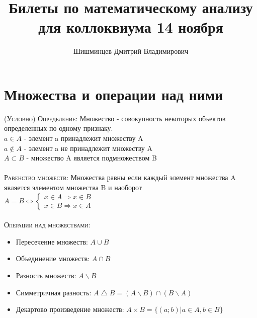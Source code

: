 \documentclass[14pt]{article}
\title{Билеты по математическому анализу для коллоквиума 14 ноября }
\author{Шишминцев Дмитрий Владимирович}
\begin{document}
    \maketitle
    \tableofcontents
    \newpage
    
    \section{Множества и операции над ними}
        \textsc{(Условно) Определение: }
        Множество - совокупность некоторых объектов определенных по одному признаку. \\
        $ a \in A $ - элемент a принадлежит множеству A \\ 
        $ a \notin A $ - элемент a не принадлежит множеству A \\ 
        $ A \subset B $ - множество A является подмножеством B \\
        \\
        \textsc{Равенство множеств: } Множества равны если каждый элемент множества A является элементом множества B и наоборот \\
        $A = B \Leftrightarrow \begin{cases}
            x \in A \Rightarrow x \in B \\ 
            x \in B \Rightarrow x \in A
        \end{cases}$\\
        \\
        \textsc{Операции над множествами:}
        \begin{itemize}
            \item Пересечение множеств: $ A \cup B $
            \item Объединение множеств: $ A \cap B $ 
            \item Разность множеств: $ A \backslash B $
            \item Симметричная разность: $ A \bigtriangleup B = (A \backslash B) \cap (B \backslash A)$
            \item Декартово произведение множеств: $ A \times B = \{(a; b) | a \in A, b \in B \}$
        \end{itemize}
\end{document}
